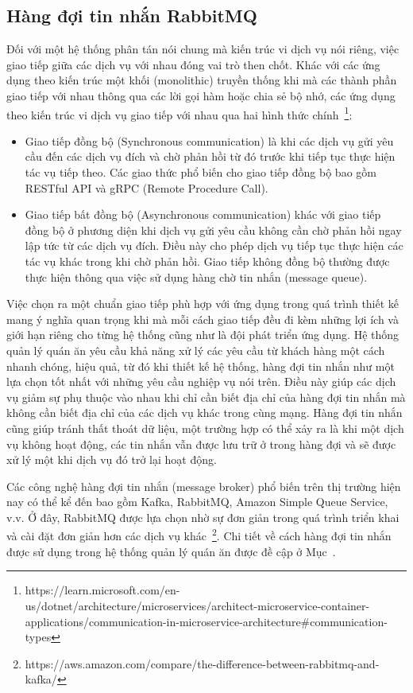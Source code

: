 \subsection{Hàng đợi tin nhắn RabbitMQ}
Đối với một hệ thống phân tán nói chung mà kiến trúc vi dịch vụ nói riêng, việc giao tiếp giữa các dịch vụ với nhau đóng vai trò then chốt.
Khác với các ứng dụng theo kiến trúc một khối (monolithic) truyền thống khi mà các thành phần giao tiếp với nhau thông qua các lời gọi hàm hoặc chia sẻ bộ nhớ, các ứng dụng theo kiến trúc vi dịch vụ giao tiếp với nhau qua hai hình thức chính~\footnote{https://learn.microsoft.com/en-us/dotnet/architecture/microservices/architect-microservice-container-applications/communication-in-microservice-architecture\#communication-types}:
\begin{itemize}
    \item Giao tiếp đồng bộ (Synchronous communication) là khi các dịch vụ gửi yêu cầu đến các dịch vụ đích và chờ phản hồi từ đó trước khi tiếp tục thực hiện tác vụ tiếp theo. Các giao thức phổ biến cho giao tiếp đồng bộ bao gồm RESTful API và gRPC (Remote Procedure Call).
    \item Giao tiếp bất đồng bộ (Asynchronous communication) khác với giao tiếp đồng bộ ở phương diện khi dịch vụ gửi yêu cầu không cần chờ phản hồi ngay lập tức từ các dịch vụ đích.
    Điều này cho phép dịch vụ tiếp tục thực hiện các tác vụ khác trong khi chờ phản hồi.
    Giao tiếp không đồng bộ thường được thực hiện thông qua việc sử dụng hàng chờ tin nhắn (message queue).
\end{itemize}
Việc chọn ra một chuẩn giao tiếp phù hợp với ứng dụng trong quá trình thiết kế mang ý nghĩa quan trọng khi mà mỗi cách giao tiếp đều đi kèm những lợi ích và giới hạn riêng cho từng hệ thống cũng như là đội phát triển ứng dụng.
Hệ thống quản lý quán ăn yêu cầu khả năng xử lý các yêu cầu từ khách hàng một cách nhanh chóng, hiệu quả, từ đó khi thiết kế hệ thống, hàng đợi tin nhắn như một lựa chọn tốt nhất với những yêu cầu nghiệp vụ nói trên.
Điều này giúp các dịch vụ giảm sự phụ thuộc vào nhau khi chỉ cần biết địa chỉ của hàng đợi tin nhắn mà không cần biết địa chỉ của các dịch vụ khác trong cùng mạng.
Hàng đợi tin nhắn cũng giúp tránh thất thoát dữ liệu, một trường hợp có thể xảy ra là khi một dịch vụ không hoạt động, các tin nhắn vẫn được lưu trữ ở trong hàng đợi và sẽ được xử lý một khi dịch vụ đó trở lại hoạt động.

Các công nghệ hàng đợi tin nhắn (message broker) phổ biến trên thị trường hiện nay có thể kể đến bao gồm Kafka, RabbitMQ, Amazon Simple Queue Service, v.v.
Ở đây, RabbitMQ được lựa chọn nhờ sự đơn giản trong quá trình triển khai và cài đặt đơn giản hơn các dịch vụ khác~\footnote{https://aws.amazon.com/compare/the-difference-between-rabbitmq-and-kafka/}.
Chi tiết về cách hàng đợi tin nhắn được sử dụng trong hệ thống quản lý quán ăn được đề cập ở Mục~.
